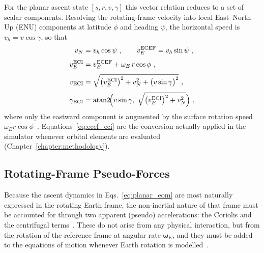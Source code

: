For the planar ascent state $[s,r,v,\gamma]$ this vector relation reduces to a set of scalar components. Resolving the rotating-frame velocity into local East--North--Up (ENU) components at latitude $\phi$ and heading $\psi$, the horizontal speed is $v_h = v\cos\gamma$, so that
\begin{subequations}\label{eq:ecef_eci}
\begin{align}
v_N &= v_h\cos\psi \ , \qquad v_E^{\mathrm{ECEF}} = v_h\sin\psi \ , \label{eq:ecef_eci_enu}\\[3pt]
v_E^{\mathrm{ECI}} &= v_E^{\mathrm{ECEF}} + \omega_E\,r\cos\phi \ , \label{eq:ecef_eci_add}\\[3pt]
v_{\mathrm{ECI}} &= \sqrt{\bigl(v_E^{\mathrm{ECI}}\bigr)^{2} + v_N^{2} + \bigl(v\sin\gamma\bigr)^{2}} \ , \label{eq:ecef_eci_speed}\\[3pt]
\gamma_{\mathrm{ECI}} &= \operatorname{atan2}\!\Bigl(v\sin\gamma,\; \sqrt{\bigl(v_E^{\mathrm{ECI}}\bigr)^{2} + v_N^{2}}\Bigr) \ , \label{eq:ecef_eci_gamma}
\end{align}
\end{subequations}
where only the eastward component is augmented by the surface rotation speed $\omega_E r\cos\phi$~\cite{relativityframes,curtis2020orbital}. Equations~\eqref{eq:ecef_eci} are the conversion actually applied in the simulator whenever orbital elements are evaluated (Chapter~\ref{chapter:methodology}).


\subsection{Rotating-Frame Pseudo-Forces}
\label{ssec:pseudo_forces}

Because the ascent dynamics in Eqs.~\eqref{eq:planar_eom} are most naturally expressed in the rotating Earth frame, the non-inertial nature of that frame must be accounted for through two apparent (pseudo) accelerations: the Coriolis and the centrifugal terms~\cite{vallado2013fundamentals}. These do not arise from any physical interaction, but from the rotation of the reference frame at angular rate $\boldsymbol{\omega}_E$, and they must be added to the equations of motion whenever Earth rotation is modelled~\cite{curtis2020orbital}.

